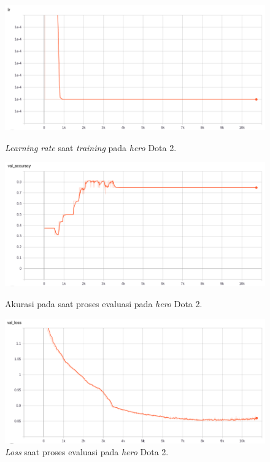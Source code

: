\begin{figure} [!h] \centering
	\includegraphics[scale=0.4]{img/callback_lr_chap4.png}
	\caption{\textit{Learning rate} saat \textit{training} pada \textit{hero} Dota 2.}
	\label{fig:nn_dota2_lr_chap4}
	\vspace{4ex}

	\includegraphics[scale=0.4]{img/callback_val_acc_chap4.png}
	\caption{Akurasi pada saat proses evaluasi pada \textit{hero} Dota 2.}
	\label{fig:nn_dota2_val_acc_chap4}
	\vspace{4ex}

	\includegraphics[scale=0.4]{img/callback_val_loss_chap4.png}
	\caption{\textit{Loss} saat proses evaluasi pada \textit{hero} Dota 2.}
	\label{fig:nn_dota2_val_loss_chap4}
\end{figure}
\clearpage


